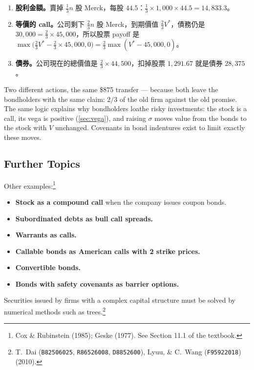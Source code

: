 \begin{remark}
	\begin{enumerate}[(1),nosep]
		\item \textbf{股利金額。}賣掉 $\frac13n$ 股 Merck，每股 $44.5$：$\frac13\times1{,}000\times44.5=14{,}833.3$。
		\item \textbf{等價的 call。}公司剩下 $\frac23n$ 股 Merck，到期價值 $\frac23V^{*}$，債務仍是 $30{,}000=\frac23\times45{,}000$，所以股票 payoff 是 $\max\bigl(\frac23V^{*}-\frac23\times45{,}000,0\bigr)=\frac23\max(V^{*}-45{,}000,0)$。
		\item \textbf{債券。}公司現在的總價值是 $\frac23\times44{,}500$，扣掉股票 $1{,}291.67$ 就是債券 $28{,}375$。
	\end{enumerate}
\end{remark}

\begin{moral}
	Two different actions, the same \$875 transfer --- because both leave the bondholders with the same claim: $2/3$ of the old firm against the old promise.
	The same logic explains why bondholders loathe risky investments: the stock is a call, its vega is positive (\autoref{sec:vega}), and raising $\sigma$ moves value from the bonds to the stock with $V$ unchanged.
	Covenants in bond indentures exist to limit exactly these moves.
\end{moral}

\suppend

\subsection{Further Topics}
\label{sec:corporate-further}


Other examples:\footnote{Cox \& Rubinstein (1985); Geske (1977). See Section 11.1 of the textbook.}
\begin{itemize}[nosep]
	\item \textbf{Stock as a compound call} when the company issues coupon bonds.
	\item \textbf{Subordinated debts as bull call spreads.}
	\item \textbf{Warrants as calls.}
	\item \textbf{Callable bonds as American calls with 2 strike prices.}
	\item \textbf{Convertible bonds.}
	\item \textbf{Bonds with safety covenants as barrier options.}
\end{itemize}
Securities issued by firms with a complex capital structure must be solved by numerical methods such as trees.\footnote{T.~Dai (\texttt{B82506025}, \texttt{R86526008}, \texttt{D8852600}), Lyuu, \& C.~Wang (\texttt{F95922018}) (2010).}

